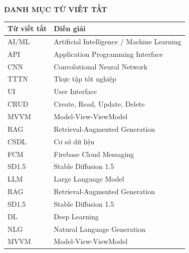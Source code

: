 \clearpage
\begin{center}
\textbf{\MakeUppercase{DANH MỤC TỪ VIẾT TẮT}}
\end{center}

\begin{center}
\begin{longtable}{|p{4cm}|p{9cm}|}
\hline
\textbf{Từ viết tắt} & \textbf{Diễn giải} \\ \hline
AI/ML & Artificial Intelligence / Machine Learning \\ \hline
API & Application Programming Interface \\ \hline
CNN & Convolutional Neural Network \\ \hline
TTTN & Thực tập tốt nghiệp \\ \hline
UI & User Interface \\ \hline
CRUD & Create, Read, Update, Delete \\ \hline
MVVM & Model-View-ViewModel \\ \hline
RAG & Retrieval-Augmented Generation \\ \hline
CSDL & Cơ sở dữ liệu \\ \hline
FCM & Firebase Cloud Messaging \\ \hline
SD1.5 & Stable Diffusion 1.5 \\ \hline
LLM & Large Language Model \\ \hline
RAG & Retrieval-Augmented Generation \\ \hline
SD1.5 & Stable Diffusion 1.5 \\ \hline
DL & Deep Learning \\ \hline
NLG & Natural Language Generation \\ \hline
MVVM & Model-View-ViewModel \\ \hline

\end{longtable}
\end{center}

\clearpage

